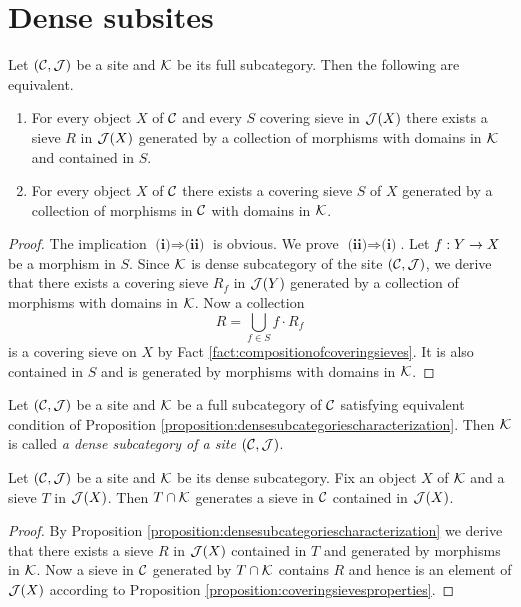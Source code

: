 \section{Dense subsites}

\begin{proposition}\label{proposition:densesubcategoriescharacterization}
Let $({\mathcal C},{\mathcal J})$ be a site and ${\mathcal K}$ be its full subcategory. Then the following are equivalent.
\begin{enumerate}[label=\emph{\textbf{(\roman*)}}, leftmargin=1.5em]
\item For every object $X$ of ${\mathcal C}$ and every $S$ covering sieve in ${\mathcal J}(X)$ there exists a sieve $R$ in ${\mathcal J}(X)$ generated by a collection of morphisms with domains in ${\mathcal K}$ and contained in $S$.
\item For every object $X$ of ${\mathcal C}$ there exists a covering sieve $S$ of $X$ generated by a collection of morphisms in ${\mathcal C}$ with domains in ${\mathcal K}$.
\end{enumerate}
\end{proposition}
\begin{proof}
The implication $\textbf{(i)}\Rightarrow \textbf{(ii)}$ is obvious. We prove $\textbf{(ii)}\Rightarrow \textbf{(i)}$. Let $f:Y\rightarrow X$ be a morphism in $S$. Since ${\mathcal K}$ is dense subcategory of the site $({\mathcal C},{\mathcal J})$, we derive that there exists a covering sieve $R_f$ in ${\mathcal J}(Y)$ generated by a collection of morphisms with domains in ${\mathcal K}$. Now a collection
$$R = \bigcup_{f\in S}f\cdot R_f$$
is a covering sieve on $X$ by Fact \ref{fact:compositionofcoveringsieves}. It is also contained in $S$ and is generated by morphisms with domains in ${\mathcal K}$.
\end{proof}

\begin{definition}
Let $({\mathcal C}, {\mathcal J})$ be a site and ${\mathcal K}$ be a full subcategory of ${\mathcal C}$ satisfying equivalent condition of Proposition \ref{proposition:densesubcategoriescharacterization}. Then ${\mathcal K}$ is called \textit{a dense subcategory of a site $({\mathcal C},{\mathcal J})$}.
\end{definition}

\begin{corollary}\label{corollary:sievesondense}
Let $({\mathcal C},{\mathcal J})$ be a site and ${\mathcal K}$ be its dense subcategory. Fix an object $X$ of ${\mathcal K}$ and a sieve $T$ in ${\mathcal J}(X)$. Then $T\cap {\mathcal K}$ generates a sieve in ${\mathcal C}$ contained in ${\mathcal J}(X)$.
\end{corollary}
\begin{proof}
By Proposition \ref{proposition:densesubcategoriescharacterization} we derive that there exists a sieve $R$ in ${\mathcal J}(X)$ contained in $T$ and generated by morphisms in ${\mathcal K}$. Now a sieve in ${\mathcal C}$ generated by $T\cap {\mathcal K}$ contains $R$ and hence is an element of ${\mathcal J}(X)$ according to Proposition \ref{proposition:coveringsievesproperties}.
\end{proof}

